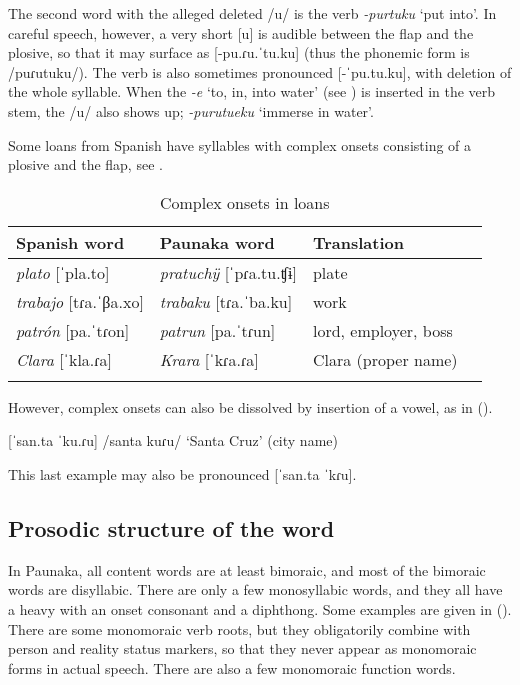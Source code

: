 The second word with the alleged deleted /u/ is the verb \textit{-purtuku} ‘put into’. In careful speech, however, a very short [u] is audible between the flap and the plosive, so that it may surface as [-pu.ɾu.ˈtu.ku] (thus the phonemic form is /puɾutuku/). The verb is also sometimes pronounced [-ˈpu.tu.ku], with deletion of the whole syllable.
When the  \textit{-e} ‘to, in, into water’ (see ) is inserted in the verb stem, the /u/ also shows up; \textit{-purutueku} ‘immerse in water’. 

Some loans from Spanish have syllables with complex onsets consisting of a plosive and the flap, see .

\begin{table}
\caption{Complex onsets in loans}

\begin{tabularx}{\textwidth}{QQQQ}
\lsptoprule Spanish word & Paunaka word & Translation \\
\midrule
\textit{plato} [ˈpla.to] & \textit{pratuchÿ} [ˈpɾa.tu.ʧɨ] & plate\\
\textit{trabajo} [tɾa.ˈβa.xo] & \textit{trabaku} [tɾa.ˈba.ku] & work\\
\textit{patrón} [pa.ˈtɾon]& \textit{patrun} [pa.ˈtɾun] & lord, employer, boss\\
\textit{Clara} [ˈkla.ɾa] & \textit{Krara} [ˈkɾa.ɾa] & Clara (proper name)\\
\lspbottomrule
\end{tabularx}

\label{table:ComplexOnsets}
\end{table}

However, complex onsets can also be dissolved by insertion of a vowel, as in ().

\ea\label{ex:NoComplexOnsets} %
    [ˈsan.ta ˈku.ɾu] \tab /santa kuɾu/ \tab ‘Santa Cruz’ (city name) \\%
    \xe 

This last example may also be pronounced [ˈsan.ta ˈkɾu].
 
\subsection{Prosodic structure of the word}\label{sec:WordStructure_subsection} 
In Paunaka, all content words are at least bimoraic, and most of the bimoraic words are disyllabic. There are only a few monosyllabic words, and they all have a heavy  with an onset consonant and a diphthong. Some examples are given in (). There are some monomoraic verb roots, but they obligatorily combine with person and reality status markers, so that they never appear as monomoraic forms in actual speech. There are also a few monomoraic function words.

